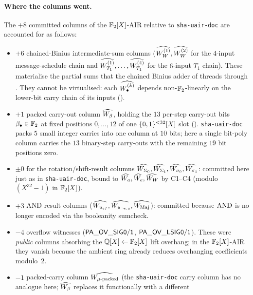 \paragraph{Where the columns went.}
The $+8$ committed columns of the $\mathbb{F}_2[X]$-AIR relative to
\texttt{sha-uair-doc} are accounted for as follows:
\begin{itemize}[leftmargin=2em,topsep=2pt]
  \item $+6$ chained-Binius intermediate-sum columns
        ($\widehat{W_W^{(1)}}, \widehat{W_W^{(2)}}$ for the $4$-input
        message-schedule chain and
        $\widehat{W_{T_1}^{(1)}}, \dots, \widehat{W_{T_1}^{(4)}}$ for the
        $6$-input $T_1$ chain). These materialise the partial sums
        that the chained Binius adder of  threads
        through . They cannot be virtualised: each
        $\widehat{W_\bullet^{(k)}}$ depends non-$\mathbb{F}_2$-linearly on the
        lower-bit carry chain of its inputs
        ().
  \item $+1$ packed carry-out column $\widehat{W_\beta}$, holding the $13$
        per-step carry-out bits $\beta_\bullet \in \mathbb{F}_2$ at fixed
        positions $0, \dots, 12$ of one $\{0,1\}^{<32}[X]$ slot
        (). \texttt{sha-uair-doc} packs $5$
        small integer carries into one column at $10$ bits; here a
        single bit-poly column carries the $13$ binary-step
        carry-outs with the remaining $19$ bit positions zero.
  \item $\pm 0$ for the rotation/shift-result columns
        $\widehat{W_{\Sigma_0}}, \widehat{W_{\Sigma_1}}, \widehat{W_{\sigma_0}},
        \widehat{W_{\sigma_1}}$: committed here just as in
        \texttt{sha-uair-doc}, bound to $\widehat{W_a}, \widehat{W_e}, \widehat{W_W}$
        by C1--C4 (modulo $(X^{32}-1)$ in $\mathbb{F}_2[X]$).
  \item $+3$ AND-result columns ($\widehat{W_{u_{ef}}},
        \widehat{W_{u_{\neg e, g}}}, \widehat{W_{\operatorname{Maj}}}$): committed because
        $\operatorname{AND}$ is no longer encoded via the booleanity sumcheck.
  \item $-4$ overflow witnesses ($\mathsf{PA\_OV\_SIG0/1}$,
        $\mathsf{PA\_OV\_LSIG0/1}$). These were \emph{public} columns
        absorbing the $\mathbb{Q}[X] \leftarrow \mathbb{F}_2[X]$ lift overhang; in the
        $\mathbb{F}_2[X]$-AIR they vanish because the ambient ring already
        reduces overhanging coefficients modulo~$2$.
  \item $-1$ packed-carry column $\widehat{W_{\mu\text{-packed}}}$ (the
        \texttt{sha-uair-doc} carry column has no analogue here;
        $\widehat{W_\beta}$ replaces it functionally with a different

\end{itemize}
